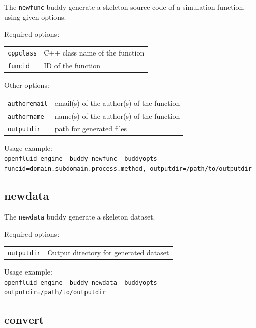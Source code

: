The \texttt{newfunc} buddy generate a skeleton source code of a simulation function, using given options. 

\bigskip

\noindent Required options:
\begin{center}
\begin{tabularx}{\linewidth}{lX}
\texttt{cppclass}&C++ class name of the function\\
\texttt{funcid}&ID of the function\\
\end{tabularx}
\end{center}
    
\noindent Other options:
\begin{center}
\begin{tabularx}{\linewidth}{lX}
\texttt{authoremail}&email(s) of the author(s) of the function\\
\texttt{authorname}&name(s) of the author(s) of the function\\
\texttt{outputdir}&path for generated files\\
\end{tabularx}
\end{center}

\bigskip

\noindent Usage example:\\
\texttt{openfluid-engine --buddy newfunc --buddyopts
funcid=domain.subdomain.process.method, outputdir=/path/to/outputdir}


\subsection{newdata}

The \texttt{newdata} buddy generate a skeleton dataset. 

\bigskip

\noindent Required options:
\begin{center}
\begin{tabularx}{\linewidth}{lX}
\texttt{outputdir}&Output directory for generated dataset\\
\end{tabularx}
\end{center}

\bigskip

\noindent Usage example:\\
\texttt{openfluid-engine --buddy newdata --buddyopts
outputdir=/path/to/outputdir}

\subsection{convert}

